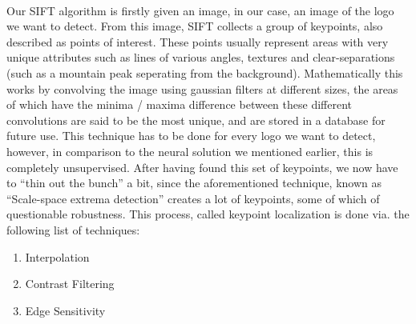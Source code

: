 \documentclass{article}
\begin{document}
\paragraph{}
Our SIFT algorithm is firstly given an image, in our case,
an image of the logo we want to detect. From this image,
SIFT collects a group of keypoints, also described as points
of interest. These points usually represent areas with very
unique attributes such as lines of various angles, textures
and clear-separations (such as a mountain peak seperating
from the background).
\newline\newline
Mathematically this works by convolving
the image using gaussian filters at different sizes, the areas
of which have the minima / maxima difference between these
different convolutions are said to be the most unique, and
are stored in a database for future use.
\newline\newline
This technique has to be done for every logo we want to detect, however, in comparison to the neural solution we mentioned earlier, this is completely unsupervised.  
After having found this set of keypoints, we now have to “thin out the bunch” a bit, since the aforementioned technique, known as “Scale-space extrema detection” creates a lot of keypoints, some of which of questionable robustness.  This process, called keypoint localization is done via. the following list of techniques:

\begin{enumerate}
  \item Interpolation
  \item Contrast Filtering
  \item Edge Sensitivity
\end{enumerate}
\end{document}
